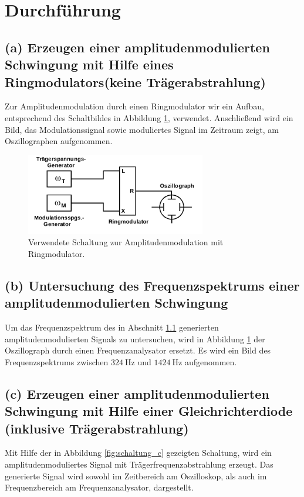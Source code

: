 \newpage
\section{Durchführung}
\label{sec:Durchführung}

\FloatBarrier
\subsection{(a) Erzeugen einer amplitudenmodulierten Schwingung mit
Hilfe eines Ringmodulators(keine Trägerabstrahlung)}
\label{subsec:durchfuehrung_a}
Zur Amplitudenmodulation durch einen Ringmodulator wir ein Aufbau,
entsprechend des Schaltbildes in Abbildung \ref{fig:schaltung_a}, verwendet.
Anschließend wird ein Bild, das Modulationssignal sowie moduliertes
Signal im Zeitraum zeigt, am Oszillographen aufgenommen.

\begin{figure}
  \centering
  \includegraphics[width=0.7\textwidth]{figures/a_d.png}
  \caption{Verwendete Schaltung zur Amplitudenmodulation mit Ringmodulator.\cite{sample}}
  \label{fig:schaltung_a}
\end{figure}

\FloatBarrier
\subsection{(b) Untersuchung des Frequenzspektrums einer
amplitudenmodulierten Schwingung}
\label{subsec:durchfuehrung_b}
Um das Frequenzspektrum des in Abschnitt \ref{subsec:durchfuehrung_a} generierten
amplitudenmodulierten Signals zu untersuchen, wird in Abbildung
\ref{fig:schaltung_a} der Oszillograph durch einen Frequenzanalysator ersetzt.
Es wird ein Bild des Frequenzspektrums zwischen $\SI{324}{\hertz}$ und $\SI{1424}{\hertz}$
aufgenommen.

\FloatBarrier
\subsection{(c) Erzeugen einer amplitudenmodulierten Schwingung
mit Hilfe einer Gleichrichterdiode (inklusive Trägerabstrahlung)}
\label{subsec:durchfuehrung_c}
Mit Hilfe der in Abbildung \ref{fig:schaltung_c} gezeigten Schaltung,
wird ein amplitudenmoduliertes Signal mit Trägerfrequenzabstrahlung erzeugt.
Das generierte Signal wird sowohl im Zeitbereich am Oszilloskop, als auch
im Frequenzbereich am Frequenzanalysator, dargestellt.


